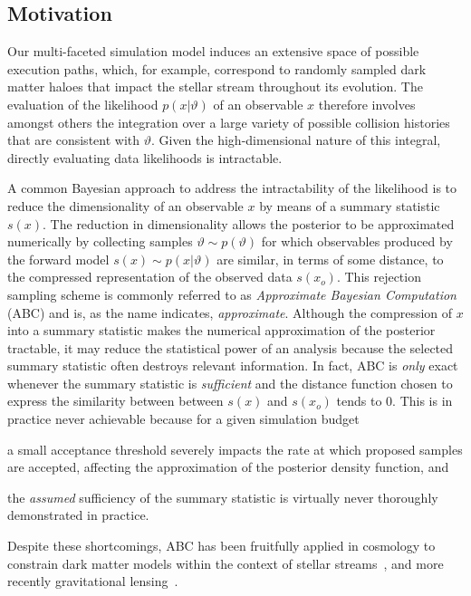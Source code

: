 \documentclass[fleqn,usenatbib]{mnras}
\begin{document}
\subsection{Motivation}
\label{sec:method_motivation}
Our multi-faceted simulation model
induces an extensive space of possible execution paths, which, for example, correspond to randomly sampled dark matter haloes that impact the stellar stream throughout its evolution.
The evaluation of the likelihood $p(x\vert\vartheta)$ of an observable $x$
therefore involves amongst others the integration over a large variety of possible collision histories that are consistent with $\vartheta$.  Given the high-dimensional nature of this integral, directly evaluating data likelihoods is intractable.

\medskip

A common Bayesian approach to address the intractability
of the likelihood is
to reduce the dimensionality of an observable $x$ by means of a
summary statistic $s(x)$.
The reduction in dimensionality
allows the posterior to be approximated numerically
by collecting samples $\vartheta\sim p(\vartheta)$
for which
observables produced by the forward model
$s(x)\sim p(x\vert\vartheta)$ are similar,
in terms of some distance, to the compressed
representation of the observed data $s(x_o)$.
This rejection sampling scheme
is commonly referred to as
\emph{Approximate Bayesian Computation}~\citep{rubin1984bayesianly} (ABC)
and is, as the name indicates, \emph{approximate}.
Although the compression of $x$ into a summary statistic makes
the numerical approximation of the posterior tractable,
it may reduce the statistical power of an analysis because
the selected summary statistic often destroys relevant information.
In fact, ABC is \emph{only} exact whenever the summary statistic
is \emph{sufficient} and the distance
function chosen to express the similarity between
between $s(x)$ and $s(x_o)$ tends to 0.
This is in practice never achievable because for a given simulation budget
\begin{enumerate*}[label=(\roman*)]
  \item a small acceptance threshold severely impacts the
rate at which proposed samples are accepted, affecting
the approximation of the posterior density function, and
  \item the \emph{assumed} sufficiency of the summary statistic is virtually never thoroughly demonstrated in practice.
\end{enumerate*}
Despite these shortcomings, ABC has been fruitfully applied
in cosmology to constrain dark matter models within the context of stellar streams~\citep{banik2018probing, bovy2019constraining, banik2019novel},
and more recently gravitational lensing~\citep{2020MNRAS.491.6077G}.
\end{document}

